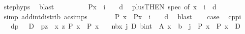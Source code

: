 \begin{isabellebody}
\ step{\isachardot}{\kern0pt}hyps\ \isamarkupfalse%
\ blast\isanewline
\ \ \ \ \isamarkupfalse%
\ \isamarkupfalse%
\ {\isachardoublequoteopen}{\isasymdots}\ {\isasymlongrightarrow}\ P{\isacharparenleft}{\kern0pt}x\ {\isacharplus}{\kern0pt}\ {\isacharparenleft}{\kern0pt}i\ {\isacharplus}{\kern0pt}\ {}{\isacharparenright}{\kern0pt}\ {\isacharasterisk}{\kern0pt}\ d{\isacharparenright}{\kern0pt}{\isachardoublequoteclose}\ \isamarkupfalse%
\ plus{\isacharbrackleft}{\kern0pt}THEN\ spec{\isacharcomma}{\kern0pt}\ of\ {\isachardoublequoteopen}x\ {\isacharplus}{\kern0pt}\ i\ {\isacharasterisk}{\kern0pt}\ d{\isachardoublequoteclose}{\isacharbrackright}{\kern0pt}\isanewline
\ \ \ \ \ \ \isamarkupfalse%
\ {\isacharparenleft}{\kern0pt}simp\ add{\isacharcolon}{\kern0pt}int{\isacharunderscore}{\kern0pt}distrib\ ac{\isacharunderscore}{\kern0pt}simps{\isacharparenright}{\kern0pt}\isanewline
\ \ \ \ \isamarkupfalse%
\ \isamarkupfalse%
\ {\isachardoublequoteopen}P\ x\ {\isasymlongrightarrow}\ P{\isacharparenleft}{\kern0pt}x\ {\isacharplus}{\kern0pt}\ {\isacharparenleft}{\kern0pt}i\ {\isacharplus}{\kern0pt}\ {}{\isacharparenright}{\kern0pt}\ {\isacharasterisk}{\kern0pt}\ d{\isacharparenright}{\kern0pt}{\isachardoublequoteclose}\ \isamarkupfalse%
\ blast\isacommand{{\isacharbraceright}{\kern0pt}}\isamarkupfalse%
\isanewline
\ \ \isamarkupfalse%
\ {\isacharquery}{\kern0pt}case\ \isacommand{{\isachardot}{\kern0pt}{\isachardot}{\kern0pt}}\isamarkupfalse%
\isanewline
{}\isamarkupfalse%
%
\endisatagproof
{\isafoldproof}%
%
\isadelimproof
\isanewline
%
\endisadelimproof
\isanewline
{}\isamarkupfalse%
\ cppi{\isacharcolon}{\kern0pt}\ \isanewline
\ \ \ dp{\isacharcolon}{\kern0pt}\ {\isachardoublequoteopen}{}\ {\isacharless}{\kern0pt}\ D{\isachardoublequoteclose}\ \ p{}{\isacharcolon}{\kern0pt}{\isachardoublequoteopen}{\isasymexists}z{\isachardot}{\kern0pt}\ {\isasymforall}\ x{\isachargreater}{\kern0pt}\ z{\isachardot}{\kern0pt}\ P\ x\ {\isacharequal}{\kern0pt}\ P{\isacharprime}{\kern0pt}\ x{\isachardoublequoteclose}\isanewline
\ \ \ nb{\isacharcolon}{\kern0pt}{\isachardoublequoteopen}{\isasymforall}x{\isachardot}{\kern0pt}{\isacharparenleft}{\kern0pt}{\isasymforall}\ j{\isasymin}\ {\isacharbraceleft}{\kern0pt}{}{\isachardot}{\kern0pt}{\isachardot}{\kern0pt}D{\isacharbraceright}{\kern0pt}{\isachardot}{\kern0pt}\ {\isasymforall}{\isacharparenleft}{\kern0pt}b{\isacharcolon}{\kern0pt}{\isacharcolon}{\kern0pt}int{\isacharparenright}{\kern0pt}\ {\isasymin}\ A{\isachardot}{\kern0pt}\ x\ {\isasymnoteq}\ b\ {\isacharminus}{\kern0pt}\ j{\isacharparenright}{\kern0pt}\ {\isasymlongrightarrow}\ P\ {\isacharparenleft}{\kern0pt}x{\isacharparenright}{\kern0pt}\ {\isasymlongrightarrow}\ P\ {\isacharparenleft}{\kern0pt}x\ {\isacharplus}{\kern0pt}\ D{\isacharparenright}{\kern0pt}{\isachardoublequoteclose}\isanewline

\end{isabellebody}
